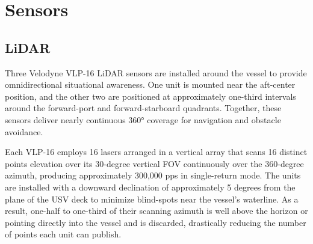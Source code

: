 \documentclass{erauthesis}
\begin{document}
\section{Sensors} \label{sensors}


\subsection{LiDAR} \label{sensors_LiDAR}


Three Velodyne VLP-16 \ac{LiDAR} sensors are installed around the vessel to provide omnidirectional situational awareness. 
One unit is mounted near the aft-center position, and the other two are positioned at approximately one-third intervals around the forward-port and forward-starboard quadrants. 
Together, these sensors deliver nearly continuous 360° coverage for navigation and obstacle avoidance.

Each VLP-16 employs 16 lasers arranged in a vertical array that scans 16 distinct points elevation over its 30-degree vertical \ac{FOV} continuously over the 360-degree azimuth, producing approximately 300,000 \ac{pps} in single-return mode. 
The units are installed with a downward declination of approximately 5 degrees from the plane of the \ac{USV} deck to minimize blind-spots near the vessel's waterline.
As a result, one-half to one-third of their scanning azimuth is well above the horizon or pointing directly into the vessel and is discarded, drastically reducing the number of points each unit can publish.
\end{document}
